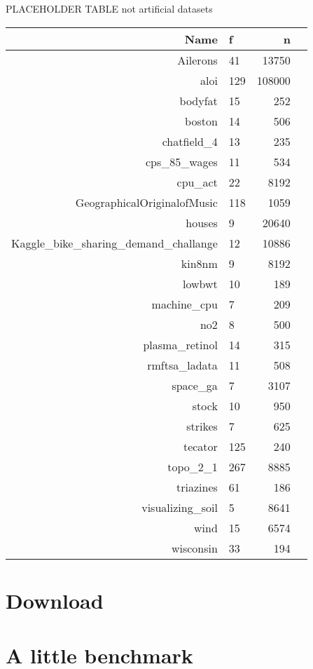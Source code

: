 \documentclass[a4paper]{article}
\begin{document}
\newline 
PLACEHOLDER TABLE not artificial datasets
\begin{table}[ht]
	\centering
	\begin{tabular}{rlrr}
		\hline
		 Name & f & n \\ 
		\hline
		 Ailerons &  41 & 13750 \\ 
		 aloi & 129 & 108000 \\ 
		 bodyfat &  15 & 252 \\ 
		 boston &  14 & 506 \\ 
		 chatfield\_4 &  13 & 235 \\ 
		 cps\_85\_wages &  11 & 534 \\ 
		 cpu\_act &  22 & 8192 \\ 
		 GeographicalOriginalofMusic & 118 & 1059 \\ 
		 houses &   9 & 20640 \\ 
		 Kaggle\_bike\_sharing\_demand\_challange &  12 & 10886 \\ 
		 kin8nm &   9 & 8192 \\ 
		 lowbwt &  10 & 189 \\ 
		 machine\_cpu &   7 & 209 \\ 
		 no2 &   8 & 500 \\ 
		 plasma\_retinol &  14 & 315 \\ 
		 rmftsa\_ladata &  11 & 508 \\ 
		 space\_ga &   7 & 3107 \\ 
		 stock &  10 & 950 \\ 
		 strikes &   7 & 625 \\ 
		 tecator & 125 & 240 \\ 
		 topo\_2\_1 & 267 & 8885 \\ 
		 triazines &  61 & 186 \\ 
		 visualizing\_soil &   5 & 8641 \\ 
		 wind &  15 & 6574 \\ 
		 wisconsin &  33 & 194 \\ 
		\hline
	\end{tabular}
\end{table}
\section{Download}

\section{A little benchmark}
\end{document}
